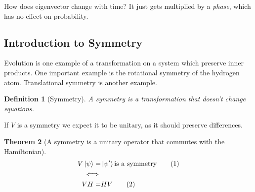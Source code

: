 \documentclass[]{article}
\newcommand\numberthis{\addtocounter{equation}{1}\tag{\theequation}}
\newtheorem{thm}{Theorem}
\newtheorem{defn}[thm]{Definition}
\begin{document}
How does eigenvector change with time? It just gets multiplied by a \emph{phase}, which has no effect on probability.

\subsection{Introduction to Symmetry}

Evolution is one example of a transformation on a system which preserve inner products. One important example is the rotational symmetry of the hydrogen atom. Translational symmetry is another example.

\begin{defn}[Symmetry]\label{defn:symmetry}
	A symmetry is a transformation that doesn't change equations. 
\end{defn}

If $V$ is a symmetry we expect it to be unitary, as it should preserve differences.

\begin{thm}[A symmetry is a unitary operator that commutes with the Hamiltonian]
	\begin{align*}
	V \ket{\psi} =& \ket{\psi^{\prime}} \text{is a symmetry}\numberthis \label{eq:symmetry}\\
	\iff&\\
	V H =& H V\numberthis \label{eq:symmetry:commute}
	\end{align*}
\end{thm}
\end{document}
